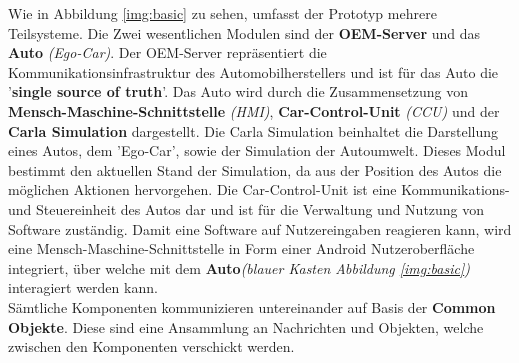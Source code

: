 Wie in Abbildung \ref{img:basic} zu sehen, umfasst der Prototyp mehrere Teilsysteme. Die Zwei wesentlichen Modulen sind der \textbf{OEM-Server} und das \textbf{Auto} \textit{(Ego-Car)}. Der OEM-Server repräsentiert die Kommunikationsinfrastruktur des Automobilherstellers und ist für das Auto die '\textbf{single source of truth}'. Das Auto wird durch die Zusammensetzung von \textbf{Mensch-Maschine-Schnittstelle} \textit{(HMI)}, \textbf{Car-Control-Unit} \textit{(CCU)} und der \textbf{Carla Simulation} dargestellt.
Die Carla Simulation beinhaltet die Darstellung eines Autos, dem 'Ego-Car', sowie der Simulation der Autoumwelt. Dieses Modul bestimmt den aktuellen Stand der Simulation, da aus der Position des Autos die möglichen Aktionen hervorgehen. Die Car-Control-Unit ist eine Kommunikations- und Steuereinheit des Autos dar und ist für die Verwaltung und Nutzung von Software zuständig. Damit eine Software auf Nutzereingaben reagieren kann, wird eine Mensch-Maschine-Schnittstelle in Form einer Android Nutzeroberfläche integriert, über welche mit dem \textbf{Auto}\textit{(blauer Kasten Abbildung \ref{img:basic})} interagiert werden kann.\\
Sämtliche Komponenten kommunizieren untereinander auf Basis der \textbf{Common Objekte}. Diese sind eine Ansammlung an Nachrichten und Objekten, welche zwischen den Komponenten verschickt werden.\\
